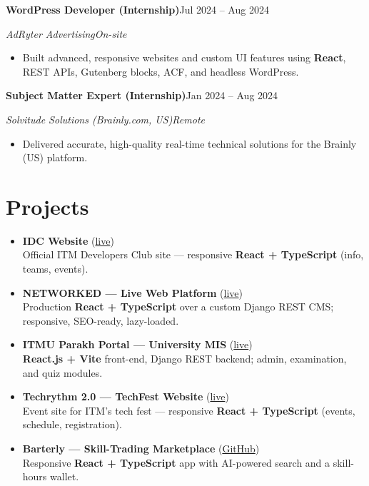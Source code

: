 \documentclass[a4paper,10pt]{article}
\newcommand{\entry}[4]{%
  \vspace{3pt}%
  \textbf{#1}\hfill #2\par
  \vspace{1pt}%
  \textit{#3}\hfill \textit{#4}\par
  \vspace{2pt}%
}
\begin{document}
\entry{WordPress Developer (Internship)}{Jul 2024 -- Aug 2024}{AdRyter Advertising}{On-site}
\begin{itemize}
  \item Built advanced, responsive websites and custom UI features using \textbf{React}, REST APIs,
        Gutenberg blocks, ACF, and headless WordPress.
\end{itemize}

\entry{Subject Matter Expert (Internship)}{Jan 2024 -- Aug 2024}{Solvitude Solutions (Brainly.com, US)}{Remote}
\begin{itemize}
  \item Delivered accurate, high-quality real-time technical solutions for the Brainly (US) platform.
\end{itemize}

\section{Projects}
\begin{itemize}
  \item \textbf{IDC Website} (\href{https://idcwebsite.onrender.com}{live})\\
        Official ITM Developers Club site --- responsive \textbf{React + TypeScript} (info, teams, events).
  \item \textbf{NETWORKED --- Live Web Platform} (\href{https://networkedconsultancy.com}{live})\\
        Production \textbf{React + TypeScript} over a custom Django REST CMS; responsive, SEO-ready, lazy-loaded.
  \item \textbf{ITMU Parakh Portal --- University MIS} (\href{https://parakh.itmuniversity.ac.in}{live})\\
        \textbf{React.js + Vite} front-end, Django REST backend; admin, examination, and quiz modules.
  \item \textbf{Techrythm 2.0 --- TechFest Website} (\href{https://techfest.itmuniversity.ac.in}{live})\\
        Event site for ITM's tech fest --- responsive \textbf{React + TypeScript} (events, schedule, registration).
  \item \textbf{Barterly --- Skill-Trading Marketplace} (\href{https://github.com/Shivam990q/Barterly-Redesigned}{GitHub})\\
        Responsive \textbf{React + TypeScript} app with AI-powered search and a skill-hours wallet.
\end{itemize}
\end{document}
